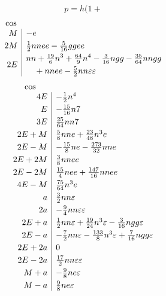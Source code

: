 \[
p=h(1+
\]
\[
\begin{array}{r|l}
\multicolumn{1}{c}{\cos}&\\
M&-e\\[3pt]
2M&\tfrac12nnee-\tfrac{5}{16}ggee\\[3pt]
2E&\begin{aligned}
&nn+\tfrac{19}{6}n^3+\tfrac{64}{9}n^4-\tfrac{3}{16}ngg-\tfrac{35}{64}nngg\\
&\quad+nnee-\tfrac52nn\varepsilon\varepsilon
\end{aligned}
\end{array}
\]
\[
\begin{array}{r|l}
\multicolumn{1}{c}{\cos}&\\
4E&-\tfrac12n^4\\[3pt]
E&-\tfrac{15}{16}n7\\[3pt]
3E&\tfrac{25}{64}nn7\\[3pt]
2E+M&\tfrac58nne+\tfrac{23}{48}n^3e\\[3pt]
2E-M&-\tfrac{15}{8}ne-\tfrac{273}{32}nne\\[3pt]
2E+2M&\tfrac38nnee\\[3pt]
2E-2M&\tfrac{15}{4}nee+\tfrac{147}{16}nnee\\[3pt]
4E-M&\tfrac{75}{64}n^3e\\[3pt]
a&\tfrac32nn\varepsilon\\[3pt]
2a&-\tfrac94nn\varepsilon\varepsilon\\[3pt]
2E+a&\tfrac12nn\varepsilon+\tfrac{19}{24}n^3\varepsilon-\tfrac{3}{16}ngg\varepsilon\\[3pt]
2E-a&-\tfrac72nn\varepsilon-\tfrac{133}{8}n^3\varepsilon+\tfrac{7}{16}ngg\varepsilon\\[3pt]
2E+2a&0\\[3pt]
2E-2a&\tfrac{17}{2}nn\varepsilon\varepsilon\\[3pt]
M+a&-\tfrac98ne\varepsilon\\[3pt]
M-a&\tfrac98ne\varepsilon
\end{array}
\]
